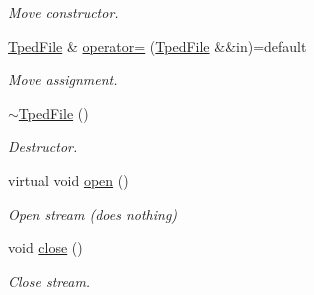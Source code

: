 \begin{DoxyCompactItemize}
\begin{DoxyCompactList}\small\item\em Move constructor. \end{DoxyCompactList}\item 
\mbox{\label{classsamp_files_1_1_tped_file_afd7ffc673202e56d415c0c673cda60fb}} 
\hyperlink{classsamp_files_1_1_tped_file}{Tped\+File} \& \hyperlink{classsamp_files_1_1_tped_file_afd7ffc673202e56d415c0c673cda60fb}{operator=} (\hyperlink{classsamp_files_1_1_tped_file}{Tped\+File} \&\&in)=default
\begin{DoxyCompactList}\small\item\em Move assignment. \end{DoxyCompactList}\item 
\mbox{\label{classsamp_files_1_1_tped_file_aa8ffb24aabf16bdb2b3aeb58aa27572e}} 
\hyperlink{classsamp_files_1_1_tped_file_aa8ffb24aabf16bdb2b3aeb58aa27572e}{$\sim$\+Tped\+File} ()
\begin{DoxyCompactList}\small\item\em Destructor. \end{DoxyCompactList}\item 
\mbox{\label{classsamp_files_1_1_tped_file_a6c6a408930f1d83a74664e8b1825d8d7}} 
virtual void \hyperlink{classsamp_files_1_1_tped_file_a6c6a408930f1d83a74664e8b1825d8d7}{open} ()
\begin{DoxyCompactList}\small\item\em Open stream (does nothing) \end{DoxyCompactList}\item 
\mbox{\label{classsamp_files_1_1_tped_file_a3723eb70be770eff95515effb282faad}} 
void \hyperlink{classsamp_files_1_1_tped_file_a3723eb70be770eff95515effb282faad}{close} ()
\begin{DoxyCompactList}\small\item\em Close stream. \end{DoxyCompactList}\end{DoxyCompactItemize}
